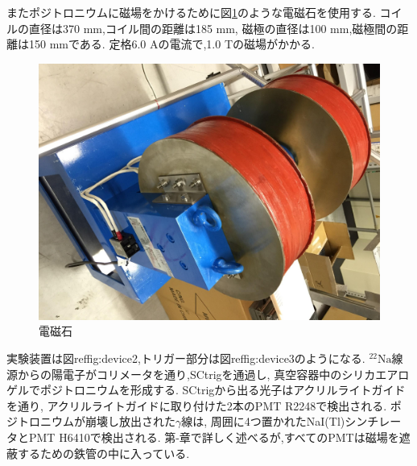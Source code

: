 
またポジトロニウムに磁場をかけるために図\ref{fig:mag}のような電磁石を使用する.
コイルの直径は370 mm,コイル間の距離は185 mm,
磁極の直径は100 mm,磁極間の距離は150 mmである.
定格6.0 Aの電流で,1.0 Tの磁場がかかる.

\begin{figure}[H]
\centering
\includegraphics[keepaspectratio,angle=90,scale=0.4]{fig/ybm/mag.pdf}
\caption{電磁石}
\label{fig:mag}
\end{figure}

実験装置は図ref{fig:device2},トリガー部分は図ref{fig:device3}のようになる.
$\mathrm{^{22}Na}$線源からの陽電子がコリメータを通り,SCtrigを通過し,
真空容器中のシリカエアロゲルでポジトロニウムを形成する.
SCtrigから出る光子はアクリルライトガイドを通り,
アクリルライトガイドに取り付けた2本のPMT R2248で検出される.
ポジトロニウムが崩壊し放出された$\gamma$線は,
周囲に4つ置かれたNaI(Tl)シンチレータとPMT H6410で検出される.
第-章で詳しく述べるが,すべてのPMTは磁場を遮蔽するための鉄管の中に入っている.

